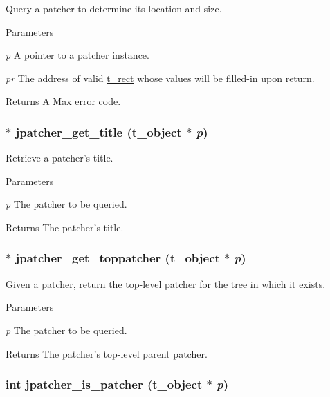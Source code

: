 Query a patcher to determine its location and size. 
\begin{DoxyParams}{Parameters}
\item[{\em p}]A pointer to a patcher instance. \item[{\em pr}]The address of valid \hyperlink{structt__rect}{t\_\-rect} whose values will be filled-\/in upon return. \end{DoxyParams}
\begin{DoxyReturn}{Returns}
A Max error code. 
\end{DoxyReturn}
\hypertarget{group__jpatcher_gae9067670d2885c808fa2db1e22a327d8}{
\subsubsection[{jpatcher\_\-get\_\-title}]{$\ast$ jpatcher\_\-get\_\-title ({\bf t\_\-object} $\ast$ {\em p})}}
\label{group__jpatcher_gae9067670d2885c808fa2db1e22a327d8}


Retrieve a patcher's title. 
\begin{DoxyParams}{Parameters}
\item[{\em p}]The patcher to be queried. \end{DoxyParams}
\begin{DoxyReturn}{Returns}
The patcher's title. 
\end{DoxyReturn}
\hypertarget{group__jpatcher_gab0fbb44da944b038c690efb0b2415a7a}{
\subsubsection[{jpatcher\_\-get\_\-toppatcher}]{$\ast$ jpatcher\_\-get\_\-toppatcher ({\bf t\_\-object} $\ast$ {\em p})}}
\label{group__jpatcher_gab0fbb44da944b038c690efb0b2415a7a}


Given a patcher, return the top-\/level patcher for the tree in which it exists. 
\begin{DoxyParams}{Parameters}
\item[{\em p}]The patcher to be queried. \end{DoxyParams}
\begin{DoxyReturn}{Returns}
The patcher's top-\/level parent patcher. 
\end{DoxyReturn}
\hypertarget{group__jpatcher_ga7ffe181b1eaf48f2380c22b6483037af}{
\subsubsection[{jpatcher\_\-is\_\-patcher}]{\setlength{\rightskip}{0pt plus 5cm}int jpatcher\_\-is\_\-patcher ({\bf t\_\-object} $\ast$ {\em p})}}
\label{group__jpatcher_ga7ffe181b1eaf48f2380c22b6483037af}


